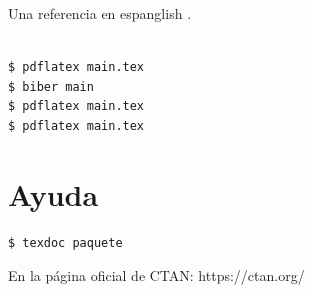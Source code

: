 Una referencia en espanglish \citet{garey1979}.


\begin{verbatim}

$ pdflatex main.tex
$ biber main
$ pdflatex main.tex
$ pdflatex main.tex
\end{verbatim}


\section{Ayuda}

\begin{verbatim}
$ texdoc paquete
\end{verbatim}

En la página oficial de CTAN: https://ctan.org/